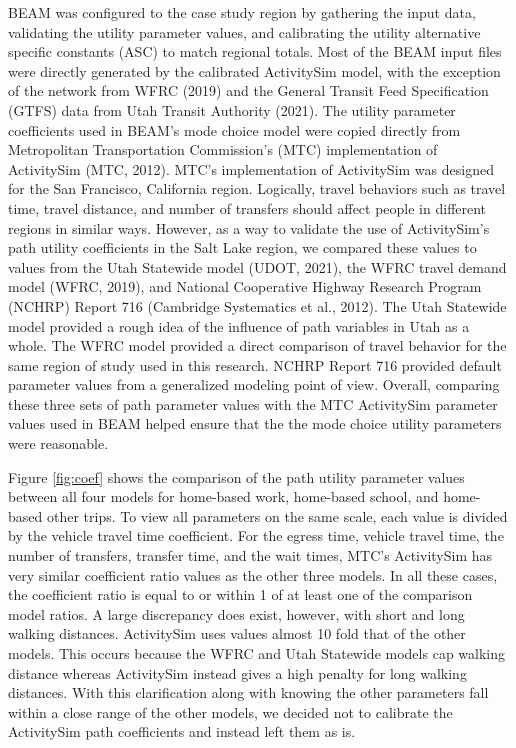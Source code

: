 \documentclass[fancy, masters]{byuthesis}
\begin{document}
BEAM was configured to the case study region by gathering the input data, validating the utility parameter values, and calibrating the utility alternative specific constants (ASC) to match regional totals. Most of the BEAM input files were directly generated by the calibrated ActivitySim model, with the exception of the network from WFRC (2019) and the General Transit Feed Specification (GTFS) data from Utah Transit Authority (2021). The utility parameter coefficients used in BEAM's mode choice model were copied directly from Metropolitan Transportation Commission's (MTC) implementation of ActivitySim (MTC, 2012). MTC's implementation of ActivitySim was designed for the San Francisco, California region. Logically, travel behaviors such as travel time, travel distance, and number of transfers should affect people in different regions in similar ways. However, as a way to validate the use of ActivitySim's path utility coefficients in the Salt Lake region, we compared these values to values from the Utah Statewide model (UDOT, 2021), the WFRC travel demand model (WFRC, 2019), and National Cooperative Highway Research Program (NCHRP) Report 716 (Cambridge Systematics et al., 2012). The Utah Statewide model provided a rough idea of the influence of path variables in Utah as a whole. The WFRC model provided a direct comparison of travel behavior for the same region of study used in this research. NCHRP Report 716 provided default parameter values from a generalized modeling point of view. Overall, comparing these three sets of path parameter values with the MTC ActivitySim parameter values used in BEAM helped ensure that the the mode choice utility parameters were reasonable.

Figure \ref{fig:coef} shows the comparison of the path utility parameter values between all four models for home-based work, home-based school, and home-based other trips. To view all parameters on the same scale, each value is divided by the vehicle travel time coefficient. For the egress time, vehicle travel time, the number of transfers, transfer time, and the wait times, MTC's ActivitySim has very similar coefficient ratio values as the other three models. In all these cases, the coefficient ratio is equal to or within 1 of at least one of the comparison model ratios. A large discrepancy does exist, however, with short and long walking distances. ActivitySim uses values almost 10 fold that of the other models. This occurs because the WFRC and Utah Statewide models cap walking distance whereas ActivitySim instead gives a high penalty for long walking distances. With this clarification along with knowing the other parameters fall within a close range of the other models, we decided not to calibrate the ActivitySim path coefficients and instead left them as is.
\end{document}
